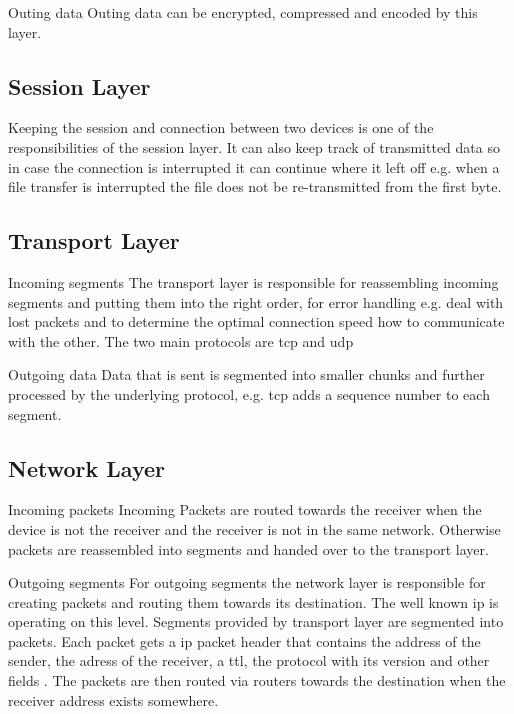 Outing data\newline
Outing data can be encrypted, compressed and encoded by this layer.

\subsection{Session Layer}
Keeping the session and connection between two devices is one of the responsibilities of the session layer. It can also keep track of transmitted data so in case the connection is interrupted it can continue where it left off e.g. when a file transfer is interrupted the file does not be re-transmitted from the first byte. 

\subsection{Transport Layer}
Incoming segments\newline
The transport layer is responsible for reassembling incoming segments and putting them into the right order, for error handling e.g. deal with lost packets and to determine the optimal connection speed how to communicate with the other. 
The two main protocols are \gls{tcp} and \gls{udp}

Outgoing data\newline
Data that is sent is segmented into smaller chunks and further processed by the underlying protocol, e.g. \gls{tcp} adds a sequence number to each segment.

\subsection{Network Layer}
Incoming packets\newline
Incoming Packets are routed towards the receiver when the device is not the receiver and the receiver is not in the same network. Otherwise packets are  reassembled into segments and handed over to the transport layer.

Outgoing segments\newline
For outgoing segments the network layer is responsible for creating packets and routing them towards its destination.
The well known \gls{ip} is operating on this level. Segments provided by transport layer  are segmented into packets. Each packet gets a \gls{ip} packet header that contains the address of the sender, the adress of the receiver, a \gls{ttl}, the protocol with its version and other fields \cite{rfc791-ip}. The packets are then routed via routers towards the destination when the receiver address exists somewhere.

